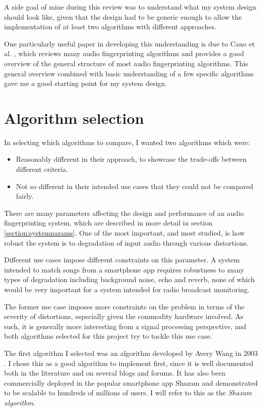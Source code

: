 \documentclass[12pt,a4paper,twoside,openright]{report}
\begin{document}
A side goal of mine during this review was to understand what my system design should look like, given that the design had to be generic enough to allow the implementation of at least two algorithms with different approaches. 

One particularly useful paper in developing this understanding is due to Cano et al. \cite{Cano02}, which reviews many audio fingerprinting algorithms and provides a good overview of the general structure of most audio fingerprinting algorithms. This general overview combined with basic understanding of a few specific algorithms gave me a good starting point for my system design.


\section{Algorithm selection}
\label{section:algoselection}

In selecting which algorithms to compare, I wanted two algorithms which were:

\begin{itemize}
  \item Reasonably different in their approach, to showcase the trade-offs between different criteria.
  \item Not so different in their intended use cases that they could not be compared fairly. 
\end{itemize}

There are many parameters affecting the design and performance of an audio fingerprinting system, which are described in more detail in section \ref{section:systemparams}. One of the most important, and most studied, is how robust the system is to degradation of input audio through various distortions. 

Different use cases impose different constraints on this parameter. A system intended to match songs from a smartphone app requires robustness to many types of degradation including background noise, echo and reverb, none of which would be very important for a system intended for radio broadcast monitoring. 

The former use case imposes more constraints on the problem in terms of the severity of distortions, especially given the commodity hardware involved. As such, it is generally more interesting from a signal processing perspective, and both algorithms selected for this project try to tackle this use case.

The first algorithm I selected was an algorithm developed by Avery Wang in 2003 \cite{Wang03}. I chose this as a good algorithm to implement first, since it is well documented both in the literature and on several blogs and forums. It has also been commercially deployed in the popular smartphone app Shazam and demonstrated to be scalable to hundreds of millions of users. I will refer to this as the \textit{Shazam algorithm}.
\end{document}
